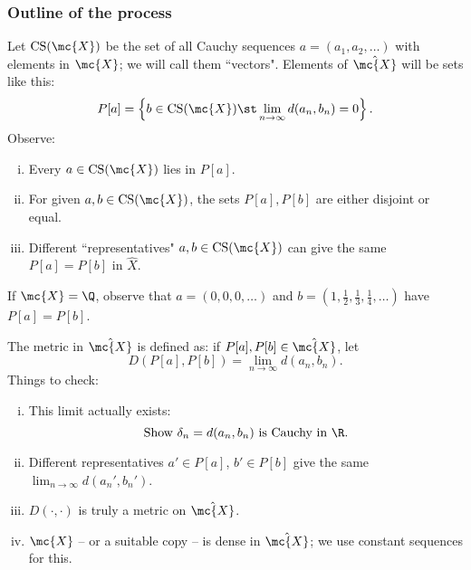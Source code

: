 \subsubsection*{Outline of the process}
Let \(\text{CS}(\mc{X})\) be the set of all Cauchy sequences \(a=(a_1,a_2,\dots)\) with elements in \(\mc{X}\); we will call them ``vectors". Elements of \(\hat{\mc{X}}\) will be sets like this:
\begin{equation*}
	P[a]=\left\{b\in\operatorname{CS}(\mc{X})\st \lim_{n\to\infty}d(a_n,b_n)=0\right\}.
\end{equation*}
Observe:
\begin{enumerate}[(i)]
	\item Every \(a\in\operatorname{CS}(\mc{X})\) lies in \(P[a]\).
	
	\item For given \(a,b\in\operatorname{CS}(\mc{X})\), the sets \(P[a],P[b]\) are either disjoint or equal.
	
	\item Different ``representatives" \(a,b\in\operatorname{CS}(\mc{X})\) can give the same \(P[a]=P[b]\) in \(\hat{X}\).
\end{enumerate}
\begin{example}
	If \(\mc{X}=\Q\), observe that \(a=(0,0,0,\dots)\) and \(b=\left(1,\displaystyle\frac{1}{2},\frac{1}{3},\frac{1}{4},\dots\right)\) have \(P[a]=P[b]\).
\end{example}
The metric in \(\hat{\mc{X}}\) is defined as: if \(P[a],P[b]\in\hat{\mc{X}}\), let 
\begin{equation*}
	D\left(P[a],P[b]\right)=\lim_{n\to\infty}d(a_n,b_n).
\end{equation*}
Things to check:
\begin{enumerate}[(i)]
	\item This limit actually exists:
	\begin{equation*}
		\text{Show}~\delta_n=d(a_n,b_n)~\text{is Cauchy in}~\R.
	\end{equation*}
	
	\item Different representatives \(a'\in P[a]\), \(b'\in P[b]\) give the same \(\displaystyle\lim_{n\to\infty}d(a_n',b_n')\).
	
	\item \(D(\cdot,\cdot)\) is truly a metric on \(\hat{\mc{X}}\).
	
	\item \(\mc{X}\) -- or a suitable copy -- is dense in \(\hat{\mc{X}}\); we use constant sequences for this.
\end{enumerate}